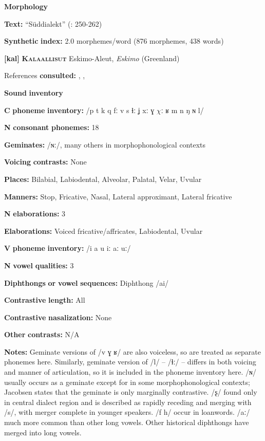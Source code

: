 \textbf{Morphology}

\textbf{Text:} “Süddialekt” (\citealt{GeorgVolodin1999}: 250-262)

\textbf{Synthetic} \textbf{index:} 2.0 morphemes/word (876 morphemes, 438 words)

\textbf{[kal]}   \textbf{\textsc{Kalaallisut}}    Eskimo-Aleut, \textit{Eskimo} (Greenland)

References \textbf{consulted:} \citet{Fortescue1984}, \citet{Hagerup2011}, \citet{Jacobsen2000}

\textbf{Sound} \textbf{inventory}

\textbf{C} \textbf{phoneme} \textbf{inventory:} /p t k q fː v s ɬː ʝ xː ɣ $\chi ː$ ʁ m n ŋ ɴ l/

\textbf{N} \textbf{consonant} \textbf{phonemes:} 18

\textbf{Geminates:} /ɴː/, many others in morphophonological contexts

\textbf{Voicing} \textbf{contrasts:} None

\textbf{Places:} Bilabial, Labiodental, Alveolar, Palatal, Velar, Uvular

\textbf{Manners:} Stop, Fricative, Nasal, Lateral approximant, Lateral fricative 

\textbf{N} \textbf{elaborations:} 3

\textbf{Elaborations:} Voiced fricative/affricates, Labiodental, Uvular

\textbf{V} \textbf{phoneme} \textbf{inventory:} /i a u iː aː uː/

\textbf{N} \textbf{vowel} \textbf{qualities:} 3

\textbf{Diphthongs} \textbf{or} \textbf{vowel} \textbf{sequences:} Diphthong /ai/

\textbf{Contrastive} \textbf{length:} All

\textbf{Contrastive} \textbf{nasalization:} None

\textbf{Other} \textbf{contrasts:} N/A

\textbf{Notes:} Geminate versions of /v ɣ ʁ/ are also voiceless, so are treated as separate phonemes here. Similarly, geminate version of /l/ -- /ɬː/ -- differs in both voicing and manner of articulation, so it is included in the phoneme inventory here. /ɴ/ usually occurs as a geminate except for in some morphophonological contexts; Jacobsen states that the geminate is only marginally contrastive. /ʂ/ found only in central dialect region and is described as rapidly receding and merging with /s/, with merger complete in younger speakers. /f h/ occur in loanwords. /aː/ much more common than other long vowels. Other historical diphthongs have merged into long vowels.

